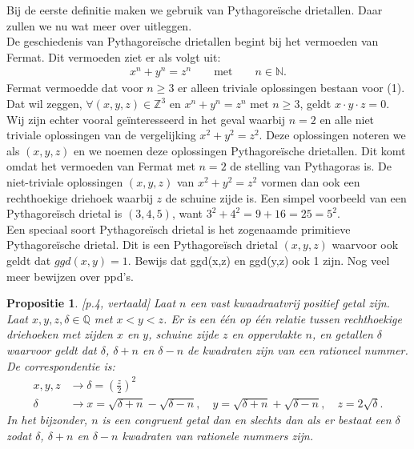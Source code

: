 \documentclass[12pt,reqno]{article}
\newcommand*{\NN}{\ensuremath{\mathbb{N}}}
\newcommand*{\ZZ}{\ensuremath{\mathbb{Z}}}
\newcommand*{\QQ}{\ensuremath{\mathbb{Q}}}
\theoremstyle{theorem}
\newtheorem{proposition}[theorem]{Propositie}
\theoremstyle{definition}
\begin{document}
	Bij de eerste definitie maken we gebruik van Pythagore\"ische drietallen. Daar zullen we nu wat meer over uitleggen.\\
	
	De geschiedenis van Pythagore\"ische drietallen begint bij het vermoeden van Fermat. Dit vermoeden ziet er als volgt uit:
	\begin{align}
	x^n + y^n = z^n \qquad \text{met} \qquad n \in \NN.
	\end{align}
	Fermat vermoedde dat voor $n \geq 3$ er alleen triviale oplossingen bestaan voor (1). Dat wil zeggen, $\forall (x,y,z) \in \ZZ^3$ en $x^n + y^n = z^n$ met $n \geq 3$, geldt $x \cdot y \cdot z = 0$. \\
	Wij zijn echter vooral ge\"interesseerd in het geval waarbij $n=2$ en alle niet triviale oplossingen van de vergelijking $x^2 + y^2 = z^2$. Deze oplossingen noteren we als $(x,y,z)$ en we noemen deze oplossingen Pythagore\"ische drietallen. Dit komt omdat het vermoeden van Fermat met $n=2$ de stelling van Pythagoras is. De niet-triviale oplossingen $(x,y,z)$ van $x^2 + y^2 = z^2$ vormen dan ook een rechthoekige driehoek waarbij $z$ de schuine zijde is. Een simpel voorbeeld van een Pythagore\"isch drietal is $(3,4,5)$, want $3^2 + 4^2 = 9 + 16 = 25 = 5^2$. \\
	Een speciaal soort Pythagore\"isch drietal is het zogenaamde primitieve Pythagore\"ische drietal. Dit is een Pythagore\"isch drietal $(x,y,z)$ waarvoor ook geldt dat $ggd(x,y)=1$.
	{\color{red}Bewijs dat ggd(x,z) en ggd(y,z) ook 1 zijn. Nog veel meer bewijzen over ppd's.}
	
	\begin{proposition}
		\cite{Koblitz}[p.4, vertaald] Laat $n$ een vast kwaadraatvrij positief getal zijn. Laat $x,y,z,\delta \in\QQ$ met $x<y<z$. Er is een \'e\'en op \'e\'en relatie tussen rechthoekige driehoeken met zijden $x$ en $y$, schuine zijde $z$ en oppervlakte $n$, en getallen $\delta$ waarvoor geldt dat $\delta$, $\delta +n$ en $\delta -n$ de kwadraten zijn van een rationeel nummer. De correspondentie is:
		\begin{align}
		x,y,z &\rightarrow \delta = \left( \frac{z}{2} \right)^2 \\
		\delta &\rightarrow x=\sqrt{\delta+n} - \sqrt{\delta-n},\quad y = \sqrt{\delta+n}+\sqrt{\delta-n},\quad z = 2\sqrt{\delta}.
		\end{align}
		In het bijzonder, $n$ is een congruent getal dan en slechts dan als er bestaat een $\delta$ zodat $\delta$, $\delta+n$ en $\delta-n$ kwadraten van rationele nummers zijn.
	\end{proposition}
	
\end{document}
